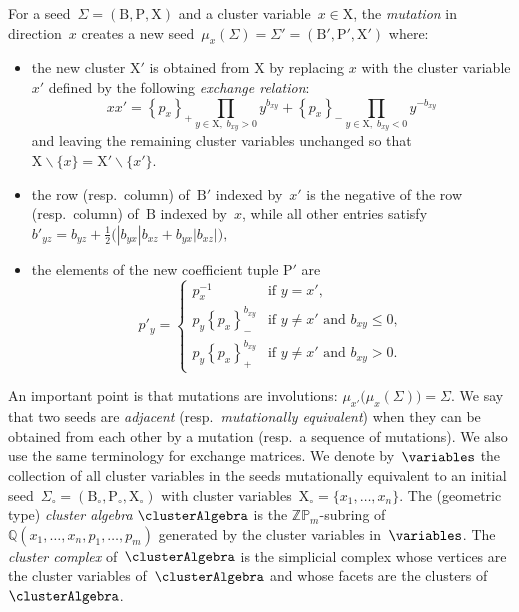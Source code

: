 \documentclass{amsart}
\theoremstyle{definition}
\newcommand{\Q}{\mathbb{Q}} %
\newcommand{\Z}{\mathbb{Z}} %
\newcommand{\ssm}{\smallsetminus} %
\newcommand{\darkblue}{\color{darkblue}} %
\newcommand{\defn}[1]{\textsl{\darkblue #1}} %
\newcommand{\Trop}[1]{\mathbb{P}_{#1}} %
\newcommand{\positiveExponents}[1]{\left\{#1\right\}_+} %
\newcommand{\negativeExponents}[1]{\left\{#1\right\}_-} %
\newcommand{\seed}{\Sigma} %
\newcommand{\cluster}{\mathrm{X}} %
\newcommand{\coefficients}{\mathrm{P}} %
\newcommand{\B}{\mathrm{B}} %
\begin{document}
For a seed~$\seed = (\B, \coefficients, \cluster)$ and a cluster variable~$x \in \cluster$, the \defn{mutation} in direction~$x$ creates a new seed~$\mu_x(\seed) = \seed' = (\B', \coefficients', \cluster')$ where:
\begin{itemize}
\item the new cluster $\cluster'$ is obtained from $\cluster$ by replacing $x$ with the cluster variable $x'$ defined by the following \defn{exchange relation}:
\[
x x' = \positiveExponents{p_x} \prod_{{y \in \cluster, \; b_{xy}  > 0}} y^{b_{xy}} + \negativeExponents{p_x} \prod_{{y \in \cluster, \; b_{xy}  <0}} y^{-b_{xy}}
\]
and leaving the remaining cluster variables unchanged so that $\cluster \ssm \{x\} = \cluster' \ssm \{x'\}$.

\item the row (resp.~column) of~$\B'$ indexed by~$x'$ is the negative of the row (resp.~column) of~$\B$ indexed by~$x$, while all other entries satisfy
\(
b'_{yz} = b_{yz} + \frac{1}{2}\big(|b_{yx}| b_{xz} + b_{yx}|b_{xz}|\big),
\)

\item the elements of the new coefficient tuple $\coefficients'$ are 
\[
p'_y =
\begin{cases}
	p_x^{-1}  & \text{if } y = x', \\
	p_y\negativeExponents{p_x}^{b_{xy}}  & \text{if } y \ne x' \text{ and } b_{xy} \leq 0, \\
	p_y\positiveExponents{p_x}^{b_{xy}}  & \text{if } y \ne x' \text{ and } b_{xy} > 0.
\end{cases}
\]
\end{itemize}
An important point is that mutations are involutions: $\mu_{x'} \big( \mu_{x}(\seed) \big) = \seed$.
We say that two seeds are \defn{adjacent} (resp.\ \defn{mutationally equivalent}) when they can be obtained from each other by a mutation (resp.\ a sequence of mutations). We also use the same terminology for exchange matrices.
We denote by~$\variables$ the collection of all cluster variables in the seeds mutationally equivalent to an initial seed~$\seed_\circ = (\B_\circ, \coefficients_\circ, \cluster_\circ)$ with cluster variables~$\cluster_\circ = \{x_1, \dots, x_n\}$.
The (geometric type) \defn{cluster algebra} $\clusterAlgebra$ is the $\Z\Trop{m}$-subring of~$\Q(x_1, \dots, x_n, p_1, \dots, p_m)$ generated by the cluster variables in~$\variables$.
The \defn{cluster complex} of~$\clusterAlgebra$ is the simplicial complex whose vertices are the cluster variables of~$\clusterAlgebra$ and whose facets are the clusters of~$\clusterAlgebra$.
\end{document}
